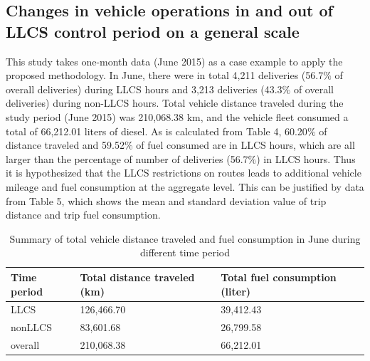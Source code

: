 \documentclass[preprint,12pt,3p]{elsarticle}
\begin{document}
\subsection{Changes in vehicle operations in and out of LLCS control period on a general scale}

This study takes one-month data (June 2015) as a case example to apply the proposed methodology. In June, there were in total 4,211 deliveries (56.7$\%$ of overall deliveries) during LLCS hours and 3,213 deliveries (43.3$\%$ of overall deliveries) during non-LLCS hours. Total vehicle distance traveled during the study period (June 2015) was 210,068.38 km, and the vehicle fleet consumed a total of 66,212.01 liters of diesel. As is calculated from Table 4, 60.20$\%$ of distance traveled and 59.52$\%$ of fuel consumed are in LLCS hours, which are all larger than the percentage of number of deliveries (56.7$\%$) in LLCS hours. Thus it is hypothesized that the LLCS restrictions on routes leads to additional vehicle mileage and fuel consumption at the aggregate level. This can be justified by data from Table 5, which shows the mean and standard deviation value of trip distance and trip fuel consumption. 


\begin{table}[H]
\footnotesize
\centering
\caption{Summary of total vehicle distance traveled and fuel consumption in June during different time period}
\label{tbl4}
\begin{tabular}{m{3cm}<{\centering} m{3cm}<{\centering} m{4cm}<{\centering}}
\toprule[1.2pt]
  \textbf{Time period} &\textbf{Total distance traveled (km)} &\textbf{Total fuel consumption (liter)} \\


  \midrule
   LLCS & 126,466.70 & 39,412.43  \\
   
   nonLLCS & 83,601.68 & 26,799.58  \\
   

   overall & 210,068.38 & 66,212.01 \\

  \bottomrule[1.2pt]
  \end{tabular}
\end{table}
\end{document}
